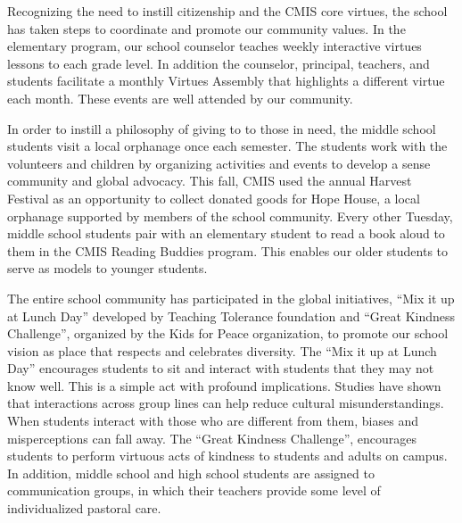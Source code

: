 Recognizing the need to instill citizenship and the CMIS core virtues, the school has taken steps to coordinate and promote our community values.  In the elementary program, our school counselor teaches weekly interactive virtues lessons to each grade level.  In addition the counselor, principal, teachers, and students facilitate a monthly Virtues Assembly that highlights a different virtue each month. These events are well attended by our community.

In order to instill a philosophy of giving to to those in need, the middle school students visit a local orphanage once each semester.  The students work with the volunteers and children by organizing activities and events to develop a sense community and global advocacy.  This fall, CMIS used the annual Harvest Festival as an opportunity to collect donated goods for Hope House, a local orphanage supported by members of the school community.  Every other Tuesday, middle school students pair with an elementary student to read a book aloud to them in the CMIS Reading Buddies program.  This enables our older students to serve as models to younger students.  

The entire school community has participated in the global initiatives, “Mix it up at Lunch Day” developed by Teaching Tolerance foundation and “Great Kindness Challenge”, organized by the Kids for Peace organization, to promote our school vision as place that respects and celebrates diversity. The “Mix it up at Lunch Day” encourages students to sit and interact with students that they may not know well. This is a simple act with profound implications. Studies have shown that interactions across group lines can help reduce cultural misunderstandings. When students interact with those who are different from them, biases and misperceptions can fall away.  The “Great Kindness Challenge”, encourages students to perform virtuous acts of kindness to students and adults on campus. In addition, middle school and high school students are assigned to communication groups, in which their teachers provide some level of individualized pastoral care.  

